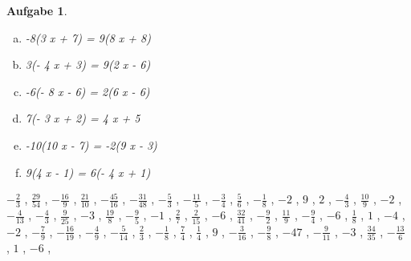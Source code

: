 \documentclass[12pt]{article}
\theoremstyle{note}
\newtheorem{aufgabe}{Aufgabe}
\begin{document}
\begin{flushleft}
\begin{aufgabe}
\begin{multicols}{2}
\begin{enumerate}[a)]
-6(2 x + 1) = -5(- x - 9)
\item 
-8(3 x + 7) = 9(8 x + 8)
\item 
3(- 4 x + 3) = 9(2 x - 6)
\item 
-6(- 8 x - 6) = 2(6 x - 6)
\item 
7(- 3 x + 2) = 4 x + 5
\item 
-10(10 x - 7) = -2(9 x - 3)
\item 
9(4 x - 1) = 6(- 4 x + 1)
\end{enumerate} 
\end{multicols} 
\end{aufgabe} 
$ \scriptstyle- \frac{2}{3}$ , $ \scriptstyle\frac{29}{54}$ , $ \scriptstyle- \frac{16}{9}$ , $ \scriptstyle\frac{21}{10}$ , $ \scriptstyle- \frac{45}{16}$ , $ \scriptstyle- \frac{31}{48}$ , $ \scriptstyle- \frac{5}{3}$ , $ \scriptstyle- \frac{11}{5}$ , $ \scriptstyle- \frac{3}{4}$ , $ \scriptstyle\frac{5}{6}$ , $ \scriptstyle- \frac{1}{8}$ , $ \scriptstyle-2$ , $ \scriptstyle9$ , $ \scriptstyle2$ , $ \scriptstyle- \frac{4}{3}$ , $ \scriptstyle\frac{10}{9}$ , $ \scriptstyle-2$ , $ \scriptstyle- \frac{4}{13}$ , $ \scriptstyle- \frac{4}{3}$ , $ \scriptstyle\frac{9}{25}$ , $ \scriptstyle-3$ , $ \scriptstyle\frac{19}{8}$ , $ \scriptstyle- \frac{9}{5}$ , $ \scriptstyle-1$ , $ \scriptstyle\frac{2}{7}$ , $ \scriptstyle\frac{2}{15}$ , $ \scriptstyle-6$ , $ \scriptstyle\frac{32}{41}$ , $ \scriptstyle- \frac{9}{2}$ , $ \scriptstyle\frac{11}{9}$ , $ \scriptstyle- \frac{9}{4}$ , $ \scriptstyle-6$ , $ \scriptstyle\frac{1}{8}$ , $ \scriptstyle1$ , $ \scriptstyle-4$ , $ \scriptstyle-2$ , $ \scriptstyle- \frac{7}{9}$ , $ \scriptstyle- \frac{16}{19}$ , $ \scriptstyle- \frac{4}{9}$ , $ \scriptstyle- \frac{5}{14}$ , $ \scriptstyle\frac{2}{3}$ , $ \scriptstyle- \frac{1}{8}$ , $ \scriptstyle\frac{7}{4}$ , $ \scriptstyle\frac{1}{4}$ , $ \scriptstyle9$ , $ \scriptstyle- \frac{3}{16}$ , $ \scriptstyle- \frac{9}{8}$ , $ \scriptstyle-47$ , $ \scriptstyle- \frac{9}{11}$ , $ \scriptstyle-3$ , $ \scriptstyle\frac{34}{35}$ , $ \scriptstyle- \frac{13}{6}$ , $ \scriptstyle1$ , $ \scriptstyle-6$ , \\[0.2em] 

\end{flushleft}
\end{document}
